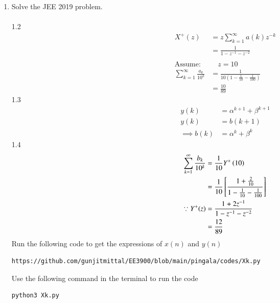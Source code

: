 \documentclass[journal,12pt,twocolumn]{IEEEtran}
\renewcommand\thesection{\arabic{section}}
\begin{document}
\begin{enumerate}[label=\thesection.\arabic*,ref=\thesection.\theenumi]
		\item 
			Solve the JEE 2019 problem.\\
		\solution\\
			1.2\\
			\begin{align}
				X^{+}(z) & =z\sum_{k=1}^{\infty} a(k) z^{-k}\\ & =\frac{1}{1-z^{-1}-z^{-2}}\\ \ \nonumber \\
				\text{Assume:}& \quad z=10\\
				\sum_{k=1}^{\infty} \frac{a_k}{10^k} & =\frac{1}{10 \left(1-\frac{1}{10}-\frac{1}{100}\right)}\\
				&=\frac{10}{89}
			\end{align}
			1.3\\
			\begin{align}
				y(k) & =\alpha^{k+1}+\beta^{k+1}\\
				y(k) & =b(k+1)\\
				\implies b(k) & =\alpha^{k}+\beta^{k}
			\end{align}
			1.4\\
			\begin{align}
				\sum_{k=1}^{\infty}\frac{b_k}{10^k} & = \frac{1}{10}Y^{+}\left({10}\right)\\
				&=\frac{1}{10}\left[\frac{1+\frac{2}{10}}{1-\frac{1}{10}-\frac{1}{100}}\right]\\
				\because Y^{+}(z) & =\frac{1+2z^{-1}}{1-z^{-1}-z^{-2}}\\
				&=\frac{12}{89}
			\end{align}
			Run the following code to get the expressions of $x(n)$ and $y(n)$
			\begin{lstlisting}
https://github.com/gunjitmittal/EE3900/blob/main/pingala/codes/Xk.py
			\end{lstlisting}
			Use the following command in the terminal to run the code
			\begin{lstlisting}
python3 Xk.py
			\end{lstlisting}

\end{enumerate}
\end{document}
